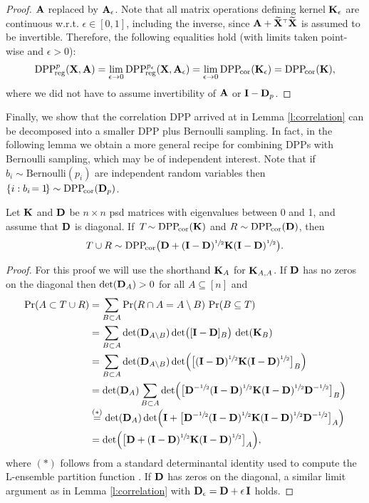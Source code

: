 \documentclass[../../thesis.tex]{subfiles}
\begin{document}
\begin{proof}
  $\mathbf A$ replaced by $\mathbf A_{\epsilon}$. Note that all matrix operations
  defining kernel $\mathbf K_\epsilon$ are continuous w.r.t. $\epsilon\in[0,1]$, including the inverse, since
  $\A+\Xt^\top\Xt$ is assumed to be invertible. Therefore, the
  following equalities hold (with limits taken point-wise and $\epsilon>0$):
  \begin{align*}
    {{\mathrm{DPP}}_{\!\mathrm{reg}}^{p}}(\mathbf X,\mathbf A) = \lim_{\epsilon\rightarrow
      0}{{\mathrm{DPP}}_{\!\mathrm{reg}}^{p_\epsilon}}(\mathbf X,\mathbf A_{\epsilon}) =
    \lim_{\epsilon\rightarrow 0}{{\mathrm{DPP}}_{\!\mathrm{cor}}}(\mathbf K_\epsilon) = {{\mathrm{DPP}}_{\!\mathrm{cor}}}(\mathbf K),
  \end{align*}
  where we did not have to assume invertibility of $\mathbf A$ or $\mathbf I-\mathbf D_p$.
\end{proof}

Finally, we show that the correlation DPP arrived at in Lemma
\ref{l:correlation} can be decomposed into a smaller DPP plus
Bernoulli sampling. In fact, in the following lemma we obtain a more
general recipe for combining DPPs with Bernoulli sampling, which may
be of independent interest. Note that if $b_i\sim\mathrm{Bernoulli}(p_i)$ are independent random
variables then $\{i:b_i\!=1\!\}\sim{{\mathrm{DPP}}_{\!\mathrm{cor}}}(\mathbf D_p)$.
\begin{lemma}\label{l:decomp_corr_dpp}
  Let $\mathbf K$ and $\mathbf D$ be $n\times n$ psd matrices with eigenvalues between
  0 and 1, and assume that $\mathbf D$ is diagonal. If\, $T\!\sim{{\mathrm{DPP}}_{\!\mathrm{cor}}}(\mathbf K)$ and
  $R\sim{{\mathrm{DPP}}_{\!\mathrm{cor}}}(\mathbf D)$, then
  \begin{align*}T\cup R\sim {{\mathrm{DPP}}_{\!\mathrm{cor}}}\big(\mathbf D+(\mathbf I-\mathbf D)^{\sfrac12}\mathbf K
      (\mathbf I-\mathbf D)^{\sfrac12}\big).
  \end{align*}
\end{lemma}
\begin{proof}
  For this proof we will use the shorthand $\mathbf K_A$ for $\mathbf K_{A,A}$. If
  $\mathbf D$ has no zeros on the diagonal then $\det(\mathbf D_A)>0$ for all
  $A\subseteq[n]$ and
  \begin{align*}
    \mathrm{Pr}(A \subset T \cup R)
     & =\sum_{B\subset A}\mathrm{Pr}(R\cap A=A\setminus B) \ \mathrm{Pr}(B\subseteq T)          \\
     & =\sum_{B\subset A}\det(\mathbf D_{A\setminus
    B})\det\!\big([\mathbf I-\mathbf D]_B\big)\,\det(\mathbf K_B)                                    \\
     & =\sum_{B\subset A}\det(\mathbf D_{A\setminus
    B})\det\!\Big(\big[(\mathbf I-\mathbf D)^{\sfrac12}\mathbf K(\mathbf I-\mathbf D)^{\sfrac12}\big]_B\Big)       \\
     & =\det(\mathbf D_A) \sum_{B\subset A}\det\!\Big(\big[\mathbf D^{-\sfrac12}
    (\mathbf I-\mathbf D)^{\sfrac12}\mathbf K(\mathbf I-\mathbf D)^{\sfrac12}\mathbf D^{-\sfrac12}\big]_{B}\Big)          \\[-1mm]
     & \overset{(*)}{=}\det(\mathbf D_A)\det\!\Big(\mathbf I + \big[\mathbf D^{-\sfrac12}
    (\mathbf I-\mathbf D)^{\sfrac12}\mathbf K(\mathbf I-\mathbf D)^{\sfrac12}\mathbf D^{-\sfrac12}\big]_A\Big)            \\
     & =\det\!\Big(\big[\mathbf D+ (\mathbf I-\mathbf D)^{\sfrac12}\mathbf K(\mathbf I-\mathbf D)^{\sfrac12}\big]_A\Big),
  \end{align*}
  where $(*)$ follows from a standard determinantal identity used to
  compute the L-ensemble partition function
  \cite[Theorem~2.1]{dpp-ml}. If $\mathbf D$ has zeros on the diagonal, a
  similar limit argument as in Lemma \ref{l:correlation} with
  $\mathbf D_\epsilon=\mathbf D+\epsilon\,\mathbf I$ holds.
\end{proof}
\end{document}
